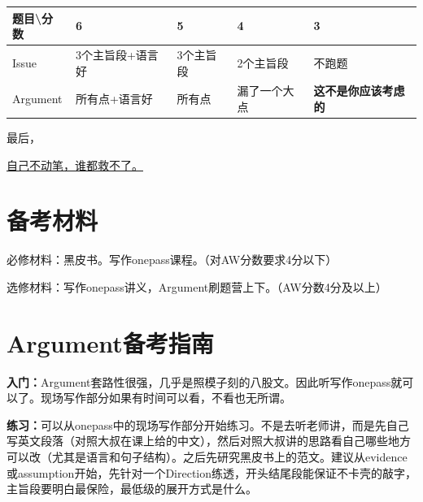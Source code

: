 \documentclass[cn,plain]{./src/qyxfbook}
\newenvironment{material}{\begin{tcolorbox}[title={材料}]}{\end{tcolorbox}}
\newcommand{\red}[1]{\textcolor[rgb]{1,0,0}{#1}}
\begin{document}
			\begin{longtable}[]{@{}lllll@{}}
				\toprule
				题目\textbackslash{}分数 & 6 & 5 & 4 & 3\tabularnewline
				\midrule
				\endhead
				Issue & 3个主旨段+语言好 & 3个主旨段 & 2个主旨段 & 不跑题\tabularnewline
				Argument & 所有点+语言好 & 所有点 & 漏了一个大点 &
				\textbf{这不是你应该考虑的}\tabularnewline
				\bottomrule
			\end{longtable}
		
			最后，\par
			\begin{center}
				\red{\underline{\huge 自己不动笔，谁都救不了。}}
			\end{center}
		
	
		\section{备考材料}
		\begin{material}
			必修材料：黑皮书。写作onepass课程。（对AW分数要求4分以下）\par
			选修材料：写作onepass讲义，Argument刷题营上下。（AW分数4分及以上）
		\end{material}
	
		\section{Argument备考指南}
			\textbf{入门：}Argument套路性很强，几乎是照模子刻的八股文。因此听写作onepass就可以了。现场写作部分如果有时间可以看，不看也无所谓。\par
			
			\textbf{练习：}可以从onepass中的现场写作部分开始练习。不是去听老师讲，而是先自己写英文段落（对照大叔在课上给的中文），然后对照大叔讲的思路看自己哪些地方可以改（尤其是语言和句子结构）。之后先研究黑皮书上的范文。建议从evidence或assumption开始，先针对一个Direction练透，开头结尾段能保证不卡壳的敲字，主旨段要明白最保险，最低级的展开方式是什么。\par
			
\end{document}
